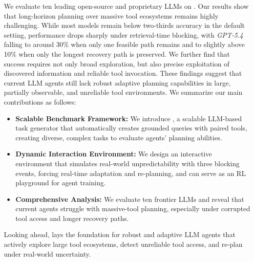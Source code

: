 We evaluate ten leading open-source and proprietary LLMs on \bench{}. 
Our results show that long-horizon planning over massive tool ecosystems remains highly challenging. 
While most models remain below two-thirds accuracy in the default setting, performance drops sharply under retrieval-time blocking, with \textit{GPT-5.4} falling to around 30\% when only one feasible path remains and to slightly above 10\% when only the longest recovery path is preserved.
We further find that success requires not only broad exploration, but also precise exploitation of discovered information and reliable tool invocation. 
These findings suggest that current LLM agents still lack robust adaptive planning capabilities in large, partially observable, and unreliable tool environments.
We summarize our main contributions as follows:
\begin{itemize}[topsep=3pt, partopsep=1.5pt, leftmargin=*, itemsep=-4.5pt]
    \item \textbf{Scalable Benchmark Framework:} We introduce \bench{}, a scalable LLM-based task generator that automatically creates grounded queries with paired tools, creating diverse, complex tasks to evaluate agents’ planning abilities.
    
    \item \textbf{Dynamic Interaction Environment:} We design an interactive environment that simulates real-world unpredictability with three blocking events, forcing real-time adaptation and re-planning, and can serve as an RL playground for agent training.
    
    \item \textbf{Comprehensive Analysis:} We evaluate ten frontier LLMs and reveal that current agents struggle with massive-tool planning, especially under corrupted tool access and longer recovery paths.
\end{itemize}
Looking ahead, \BENCH{} lays the foundation for robust and adaptive LLM agents that actively explore large tool ecosystems, detect unreliable tool access, and re-plan under real-world uncertainty.

